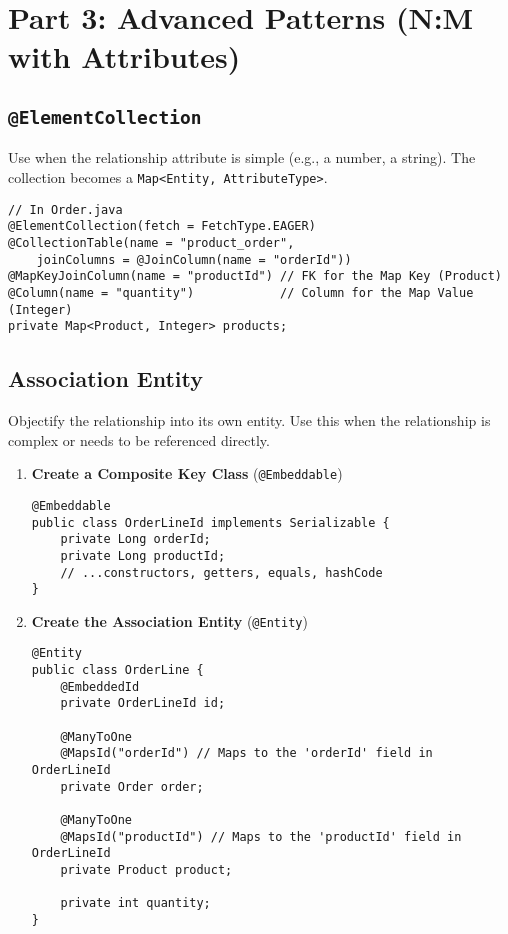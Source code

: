 \section*{Part 3: Advanced Patterns (N:M with Attributes)}
\subsection*{\texttt{@ElementCollection}}
Use when the relationship attribute is simple (e.g., a number, a string). The collection becomes a \texttt{Map<Entity, AttributeType>}.
\begin{verbatim}
// In Order.java
@ElementCollection(fetch = FetchType.EAGER)
@CollectionTable(name = "product_order", 
    joinColumns = @JoinColumn(name = "orderId"))
@MapKeyJoinColumn(name = "productId") // FK for the Map Key (Product)
@Column(name = "quantity")            // Column for the Map Value (Integer)
private Map<Product, Integer> products;
\end{verbatim}

\subsection*{Association Entity}
Objectify the relationship into its own entity. Use this when the relationship is complex or needs to be referenced directly.
\begin{enumerate}
    \item \textbf{Create a Composite Key Class} (\texttt{@Embeddable})
    \begin{verbatim}
@Embeddable
public class OrderLineId implements Serializable {
    private Long orderId;
    private Long productId;
    // ...constructors, getters, equals, hashCode
}
    \end{verbatim}
    \item \textbf{Create the Association Entity} (\texttt{@Entity})
    \begin{verbatim}
@Entity
public class OrderLine {
    @EmbeddedId
    private OrderLineId id;

    @ManyToOne
    @MapsId("orderId") // Maps to the 'orderId' field in OrderLineId
    private Order order;

    @ManyToOne
    @MapsId("productId") // Maps to the 'productId' field in OrderLineId
    private Product product;

    private int quantity;
}
    \end{verbatim}
\end{enumerate}

